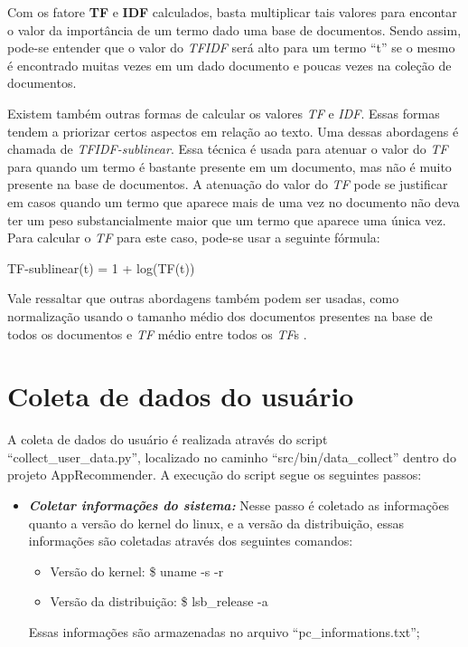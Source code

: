 \begin{anexosenv}
Com os fatore \textbf{TF} e \textbf{IDF} calculados, basta multiplicar tais
valores para encontar o valor da importância de um termo dado uma base de
documentos. Sendo assim, pode-se entender que o valor do \textit{TFIDF} será
alto para um termo ``t'' se o mesmo é encontrado muitas vezes em um dado
documento e poucas vezes na coleção de documentos.

Existem também outras formas de calcular os valores \textit{TF} e \textit{IDF}.
Essas formas tendem a priorizar certos aspectos em relação ao texto. Uma dessas
abordagens é chamada de \textit{TFIDF-sublinear}. Essa técnica é usada para
atenuar o valor do \textit{TF} para quando um termo é bastante presente em um
documento, mas não é muito presente na base de documentos. A atenuação do valor
do \textit{TF} pode se justificar em casos quando um termo que aparece mais de
uma vez no documento não deva ter um peso substancialmente maior que um termo
que aparece uma única vez. Para calcular o \textit{TF} para este caso, pode-se
usar a seguinte fórmula:

TF-sublinear(t) = 1 + log(TF(t))

Vale ressaltar que outras abordagens também podem ser usadas, como normalização
usando o tamanho médio dos documentos presentes na base de todos os documentos e
\textit{TF} médio entre todos os \textit{TF}s \cite{araujo2011apprecommender}.

\chapter{Coleta de dados do usuário}

A coleta de dados do usuário é realizada através do script ``collect\_user\_data.py'',
localizado no caminho ``src/bin/data\_collect'' dentro do projeto AppRecommender.
A execução do script segue os seguintes passos:

\begin{itemize}
  \item \textit{\textbf{Coletar informações do sistema:}} Nesse passo é coletado
  as informações quanto a versão do kernel do linux, e a versão da distribuição,
  essas informações são coletadas através dos seguintes comandos:
  \begin{itemize}
    \item Versão do kernel: \$ uname -s -r
    \item Versão da distribuição: \$ lsb\_release -a
  \end{itemize}
  Essas informações são armazenadas no arquivo ``pc\_informations.txt'';


\end{itemize}
\end{anexosenv}
